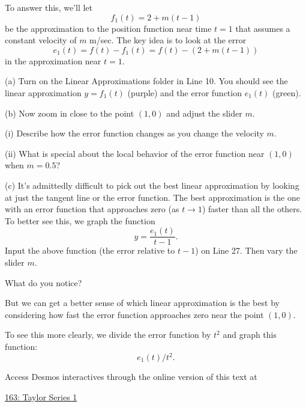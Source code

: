 \documentclass{ximera}
\begin{document}
To answer this, we'll let
\[
   f_1(t) = 2 + m(t-1)
\]
be the approximation to the position function near time $t=1$ that assumes a constant velocity of $m$ m/sec. The key idea is to look at the error
\[
    e_1(t) = f(t) - f_1(t) = f(t) - (2 + m(t-1))
\]
in the approximation near $t=1$.

\begin{exploration}\label{Exp3:Comp}
(a) Turn on the Linear Approximations folder in Line 10. You should see the linear approximation $y=f_1(t)$ (purple) and the error function $e_1(t)$ (green).

(b) Now zoom in close to the point $(1,0)$ and adjust the slider $m$.
\begin{question} \label{Qfdsg677}
(i) Describe how the error function changes as you change the velocity $m$.

(ii) What is special about the local behavior of the error function near $(1,0)$ when $m=0.5$?
\end{question}

(c) It's admittedly difficult to pick out the best linear approximation by looking at just the tangent line or the error function. The best approximation is the one with an error function that approaches zero (as $t\to 1$) faster than all the others. To better see this, we graph the function
\[
    y = \frac{e_1(t)}{t-1} .
\]
Input the above function (the error relative to $t-1$) on Line 27. Then vary the slider $m$.

\begin{question} \label{Q3435rgg}
What do you notice? 
\end{question}



But we can get a better sense of which linear approximation is the best by considering how fast the error function approaches zero near the point $(1,0)$. 

To see this more clearly, we divide the error function by $t^2$ and graph this function: 
\[
   e_1(t) / t^2 .
\]


 
\begin{onlineOnly}
    \begin{center}
\end{center}
\end{onlineOnly}

Access Desmos interactives through the online version of this text at
 
\href{https://www.desmos.com/calculator/ueb0dgixdq}{163: Taylor Series 1}
\end{exploration}
\end{document}
